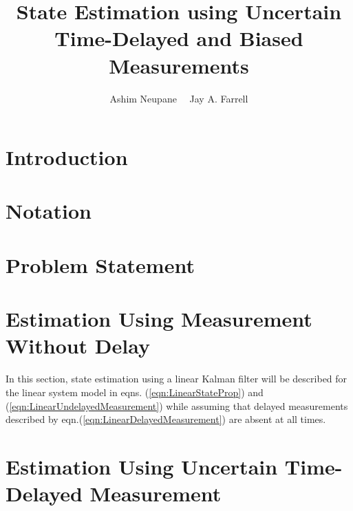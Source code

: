 
\usepackage{tikz}
\usepackage{wrapfig}
\usepackage{caption}
\usepackage{stfloats}
\DeclareMathAlphabet{}


\title{State Estimation using Uncertain Time-Delayed and Biased Measurements}
\author{Ashim Neupane \ \ Jay A. Farrell
}%

\maketitle

		
\section{Introduction}	
	
	
\section{Notation}	\label{sect:notation}
	

\section{Problem Statement}\label{sect:problem_statement}
	

\section{Estimation Using Measurement Without Delay} \label{sect:estimation_no_delayed_msr}
	In this section, state estimation using a linear Kalman filter will be described for the linear system model in eqns. (\ref{eqn:LinearStateProp}) and (\ref{eqn:LinearUndelayedMeasurement}) while assuming that delayed measurements described by eqn.(\ref{eqn:LinearDelayedMeasurement}) are absent at all times.\\
		
%	
	

\section{Estimation Using Uncertain Time-Delayed Measurement} \label{sect:estimation_delayed_msr}	
	
	
